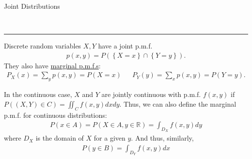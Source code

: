 \documentclass{article}
\newcommand{\header}[1]{\begin{large}\noindent #1\end{large}\\\rule{\textwidth}{0.5pt}}
\newcommand{\curly}[1]{\left\{#1\right\}}
\begin{document}
\header{Joint Distributions}

Discrete random variables $X, Y$ have a joint p.m.f. 
\begin{align*}
    p(x, y) = P\left(\curly{X = x} \cap \curly{Y = y}\right).
\end{align*}
They also have \underline{marginal p.m.f.s}:
\begin{align*}
    P_X(x) = \sum_y p(x, y) = P(X = x) && P_Y(y) = \sum_x p(x, y) = P(Y = y).
\end{align*}

In the continuous case, $X$ and $Y$ are jointly continuous with p.m.f. $f(x, y)$ if $P((X, Y) \in C) = \iint_C f(x, y)dxdy$.
Thus, we can also define the marginal p.m.f. for continuous distributions:
\begin{align*}
    P(x \in A) = P(X \in A, y \in \mathbb{R}) = \int_{D_X} f(x, y)dy
\end{align*}
where $D_X$ is the domain of $X$ for a given $y$. And thus, similarly,
\begin{align*}
    P(y \in B) = \int_{D_Y} f(x, y)dx
\end{align*}
\end{document}
